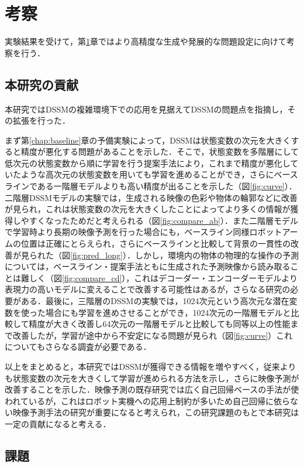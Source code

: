 \chapter{考察}
\label{chap:discussion}

実験結果を受けて，第\ref{chap:discussion}章ではより高精度な生成や発展的な問題設定に向けて考察を行う．

\section{本研究の貢献}

本研究ではDSSMの複雑環境下での応用を見据えてDSSMの問題点を指摘し，その拡張を行った．

まず第\ref{chap:baseline}章の予備実験によって，DSSMは状態変数の次元を大きくすると精度が悪化する問題があることを示した．そこで，状態変数を多階層にして低次元の状態変数から順に学習を行う提案手法により，これまで精度が悪化していたような高次元の状態変数を用いても学習を進めることができ，さらにベースラインである一階層モデルよりも高い精度が出ることを示した（図\ref{fig:curve}）．二階層DSSMモデルの実験では，生成される映像の色彩や物体の輪郭などに改善が見られ，これは状態変数の次元を大きくしたことによってより多くの情報が獲得しやすくなったためだと考えられる（図\ref{fig:compare_ab}）．また二階層モデルで学習時より長期の映像予測を行った場合にも，ベースライン同様ロボットアームの位置は正確にとらえられ，さらにベースラインと比較して背景の一貫性の改善が見られた（図\ref{fig:pred_long}）．しかし，環境内の物体の物理的な操作の予測については，ベースライン・提案手法ともに生成された予測映像から読み取ることは難しく（図\ref{fig:compare_cd}），これはデコーダー・エンコーダーモデルより表現力の高いモデルに変えることで改善する可能性はあるが，さらなる研究の必要がある．最後に，三階層のDSSMの実験では，1024次元という高次元な潜在変数を使った場合にも学習を進めさせることができ，1024次元の一階層モデルと比較して精度が大きく改善し64次元の一階層モデルと比較しても同等以上の性能まで改善したが，学習が途中から不安定になる問題が見られ（図\ref{fig:curve}）これについてもさらなる調査が必要である．

以上をまとめると，本研究ではDSSMが獲得できる情報を増やすべく，従来よりも状態変数の次元を大きくして学習が進められる方法を示し，さらに映像予測が改善することを示した．映像予測の既存研究では広く自己回帰ベースの手法が使われているが，これはロボット実機への応用上制約が多いため自己回帰に依らない映像予測手法の研究が重要になると考えられ，この研究課題のもとで本研究は一定の貢献になると考える．

\section{課題}

